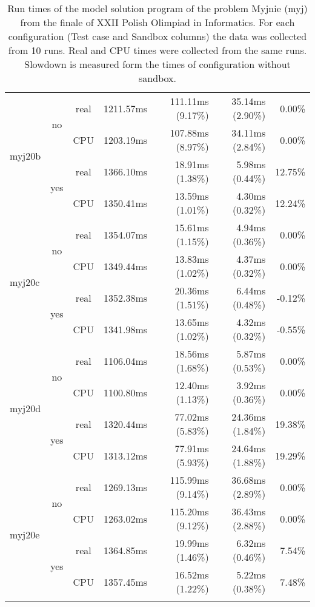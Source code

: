\documentclass[en]{pracamgr}
\begin{document}
\begin{small}
\begin{longtable}{|l|c|c|r|r|r|r|}
\hline
\multirow{4}{*}{myj20b}   & \multirow{2}{*}{no}  & real & 1211.57ms & 111.11ms (9.17\%) & 35.14ms (2.90\%) & 0.00\% \\*
                          &                      & CPU  & 1203.19ms & 107.88ms (8.97\%) & 34.11ms (2.84\%) & 0.00\% \\*
                          \cline{2-7}
                          & \multirow{2}{*}{yes} & real & 1366.10ms & 18.91ms (1.38\%) & 5.98ms (0.44\%) & 12.75\% \\*
                          &                      & CPU  & 1350.41ms & 13.59ms (1.01\%) & 4.30ms (0.32\%) & 12.24\% \\
\hline
\multirow{4}{*}{myj20c}   & \multirow{2}{*}{no}  & real & 1354.07ms & 15.61ms (1.15\%) & 4.94ms (0.36\%) & 0.00\% \\*
                          &                      & CPU  & 1349.44ms & 13.83ms (1.02\%) & 4.37ms (0.32\%) & 0.00\% \\*
                          \cline{2-7}
                          & \multirow{2}{*}{yes} & real & 1352.38ms & 20.36ms (1.51\%) & 6.44ms (0.48\%) & -0.12\% \\*
                          &                      & CPU  & 1341.98ms & 13.65ms (1.02\%) & 4.32ms (0.32\%) & -0.55\% \\
\hline
\multirow{4}{*}{myj20d}   & \multirow{2}{*}{no}  & real & 1106.04ms & 18.56ms (1.68\%) & 5.87ms (0.53\%) & 0.00\% \\*
                          &                      & CPU  & 1100.80ms & 12.40ms (1.13\%) & 3.92ms (0.36\%) & 0.00\% \\*
                          \cline{2-7}
                          & \multirow{2}{*}{yes} & real & 1320.44ms & 77.02ms (5.83\%) & 24.36ms (1.84\%) & 19.38\% \\*
                          &                      & CPU  & 1313.12ms & 77.91ms (5.93\%) & 24.64ms (1.88\%) & 19.29\% \\
\hline
\multirow{4}{*}{myj20e}   & \multirow{2}{*}{no}  & real & 1269.13ms & 115.99ms (9.14\%) & 36.68ms (2.89\%) & 0.00\% \\*
                          &                      & CPU  & 1263.02ms & 115.20ms (9.12\%) & 36.43ms (2.88\%) & 0.00\% \\*
                          \cline{2-7}
                          & \multirow{2}{*}{yes} & real & 1364.85ms & 19.99ms (1.46\%) & 6.32ms (0.46\%) & 7.54\% \\*
                          &                      & CPU  & 1357.45ms & 16.52ms (1.22\%) & 5.22ms (0.38\%) & 7.48\% \\
\hline
\caption{Run times of the model solution program of the problem Myjnie (myj) from the finale of XXII Polish Olimpiad in Informatics. For each configuration (Test case and Sandbox columns) the data was collected from 10 runs. Real and CPU times were collected from the same runs. Slowdown is measured form the times of configuration without sandbox.}
\label{table:myj_model_solution_runtimes}
\end{longtable}
\end{small}
\end{document}
